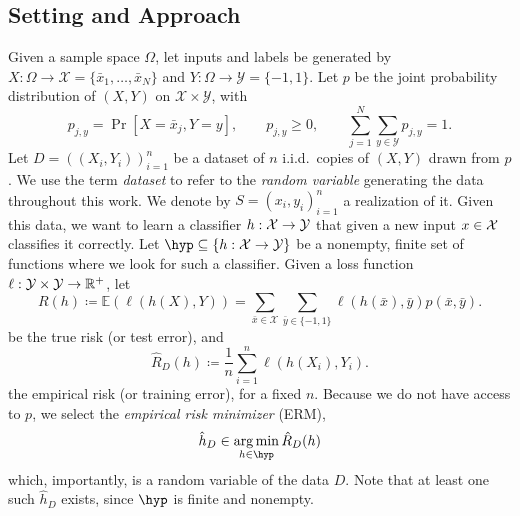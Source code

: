 \documentclass[reqno]{amsart}
\begin{document}
\subsection{Setting and Approach}
Given a sample space $\Omega$, let inputs and labels be generated by $X:\Omega \to \mathcal X = \{\bar x_1,\ldots,\bar x_N\}$ and $Y: \Omega \to \mathcal Y = \{-1, 1\}$. Let $p$ be the joint probability distribution of $(X,Y)$ on $\mathcal X\times\mathcal Y$, with
\[
 p_{j,y}=\Pr[X=\bar x_j,Y=y],\qquad
 p_{j,y}\ge0,\qquad
 \sum_{j=1}^N\sum_{y\in\mathcal Y}p_{j,y}=1.
\]
Let $D = {((X_i, Y_i))}_{i=1}^n$ be a dataset of $n$ i.i.d.\ copies of $(X,Y)$ drawn from $p$. We use the term {\it dataset\/} to refer to the {\it random variable\/} generating the data throughout this work. We denote by $S = {(x_i, y_i)}_{i=1}^n$ a realization of it. Given this data, we want to learn a classifier $h:\mathcal{X}\to\mathcal{Y}$ that given a new input $x\in\mathcal{X}$ classifies it correctly. 
Let $\hyp \subseteq \{h:\mathcal X \to \Y\}$ be a nonempty, finite set of functions where we look for such a classifier.
Given a loss function $\ell:\mathcal{Y} \times \mathcal Y \to \mathbb R^+$, let
\[
    R(h) \coloneq \mathbb E(\ell(h(X), Y)) = \sum_{\bar x\in\mathcal X} \sum_{\bar y \in\{-1,1\}} \ell(h(\bar x), \bar y) p(\bar x, \bar y).
\]
be the true risk (or test error), and
\[
    \hat R_D (h) \coloneq \frac{1}{n}\sum_{i=1}^n \ell(h(X_i), Y_i).
\]
the empirical risk (or training error), for a fixed $n$. 
Because we do not have access to $p$, we select the {\it empirical risk minimizer\/} (ERM), 
\begin{equation}\label{eq: ERM}
    \hat h_D \in \argmin_{h\in \hyp} \hat R_D (h)
\end{equation}
which, importantly, is a random variable of the data $D$. Note that at least one such $\hat h_D$ exists, since $\hyp$ is finite and nonempty. 
\end{document}
